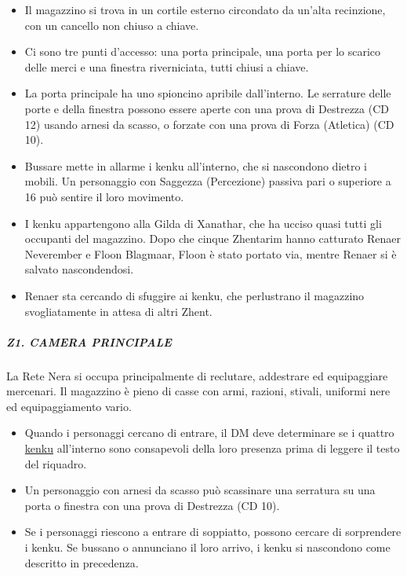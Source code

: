 \documentclass{article}
\begin{document}
\begin{itemize}
    \item Il magazzino si trova in un cortile esterno circondato da un’alta recinzione, con un cancello non chiuso a chiave.
    \item Ci sono tre punti d'accesso: una porta principale, una porta per lo scarico delle merci e una finestra riverniciata, tutti chiusi a chiave.
    \item La porta principale ha uno spioncino apribile dall'interno. Le serrature delle porte e della finestra possono essere aperte con una prova di Destrezza (CD 12) usando arnesi da scasso, o forzate con una prova di Forza (Atletica) (CD 10).
    \item Bussare mette in allarme i kenku all'interno, che si nascondono dietro i mobili. Un personaggio con Saggezza (Percezione) passiva pari o superiore a 16 può sentire il loro movimento.
    \item I kenku appartengono alla Gilda di Xanathar, che ha ucciso quasi tutti gli occupanti del magazzino. Dopo che cinque Zhentarim hanno catturato Renaer Neverember e Floon Blagmaar, Floon è stato portato via, mentre Renaer si è salvato nascondendosi.
    \item Renaer sta cercando di sfuggire ai kenku, che perlustrano il magazzino svogliatamente in attesa di altri Zhent.
\end{itemize}

                        \subparagraph{Z1. CAMERA PRINCIPALE}
                        La Rete Nera si occupa principalmente di reclutare, addestrare ed equipaggiare mercenari. Il magazzino è pieno di casse con armi, razioni, stivali, uniformi nere ed equipaggiamento vario.

                        \begin{itemize}
                            \item Quando i personaggi cercano di entrare, il DM deve determinare se i quattro \hyperlink{kenk}{kenku} all'interno sono consapevoli della loro presenza prima di leggere il testo del riquadro.
                            \item Un personaggio con arnesi da scasso può scassinare una serratura su una porta o finestra con una prova di Destrezza (CD 10).
                            \item Se i personaggi riescono a entrare di soppiatto, possono cercare di sorprendere i kenku. Se bussano o annunciano il loro arrivo, i kenku si nascondono come descritto in precedenza.
                        \end{itemize}
\end{document}
